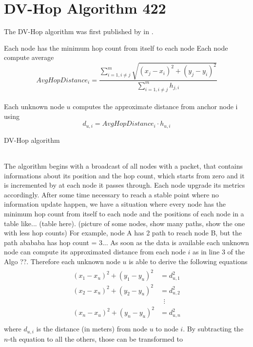 \documentclass[12pt,twoside]{report}
\begin{document}
\section{DV-Hop Algorithm 422}
The DV-Hop algorithm was first published by in \cite{965964}.\\
\begin{algorithm}[H]
\SetAlgoLined
{}
Each node has the minimum hop count from itself to each node\;
Each node compute average 
\begin{equation}
    AvgHopDistance_i=\frac{\sum_{i=1,i\neq j}^m\sqrt{(x_j-x_i)^2+(y_j-y_i)^2}}{\sum_{i=1,i\neq j}^mh_{j,i}}
\end{equation}\\
Each unknown node $u$ computes the approximate distance from anchor node i using 
\begin{equation}
    d_{u,i}=AvgHopDistance_i \cdot h_{u,i}
\end{equation}
 \caption{DV-Hop algorithm}
\end{algorithm}
\noindent\\
The algorithm begins with a broadcast of all nodes with a packet, that contains informations about its position and the hop count, which starts from zero and it is incremented by at each node it passes through. Each node upgrade its metrics accordingly. After some time necessary to reach a stable point where no information update happen, we have a situation where every node has the minimum hop count from itself to each node and the positions of each node in a table like... (table here). (picture of some nodes, show many paths, show the one with less hop counts) For example, node A has 2 path to reach node B, but the path abababa has hop count = 3...
As soon as the data is available each unknown node can compute its approximated distance from each node $i $ as in line $3$ of the Algo ??. Therefore each unknown node $u$ is able to derive the following equations
\begin{align}
\begin{split} 
(x_1-x_u)^2+(y_1-y_u)^2&=d_{u,1}^2 \\ 
(x_2-x_u)^2+(y_2-y_u)^2&=d_{u,2}^2 \\ 
&\;\;\vdots\\
(x_n-x_u)^2+(y_n-y_u)^2&=d_{u,n}^2 \\
\end{split}
\end{align} 
where $d_{u,i}$ is the distance (in meters) from node $u$ to node $i$.
By subtracting the $n$-th equation to all the others, those can be transformed to
\end{document}
